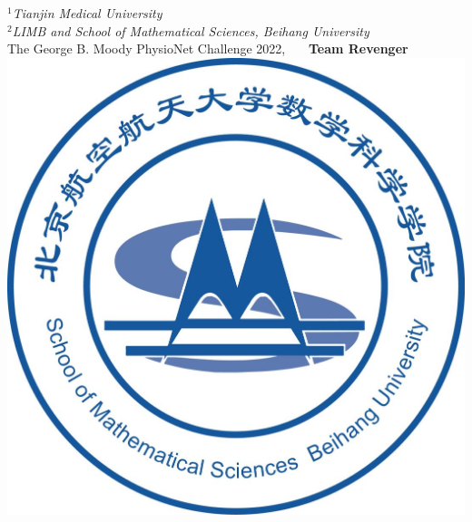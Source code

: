 \documentclass[a0paper,portrait]{baposter}
\begin{document}
\begin{poster}
{\smaller $^1${\it Tianjin Medical University} \\ $^2${\it LIMB and School of Mathematical Sciences, Beihang University} \\
{\Large The George B. Moody PhysioNet Challenge 2022, ~~~\bf{Team Revenger}}
} %
{\includegraphics[scale=0.084]{logo_buaa_math.jpg}} %






\end{poster}
\end{document}
